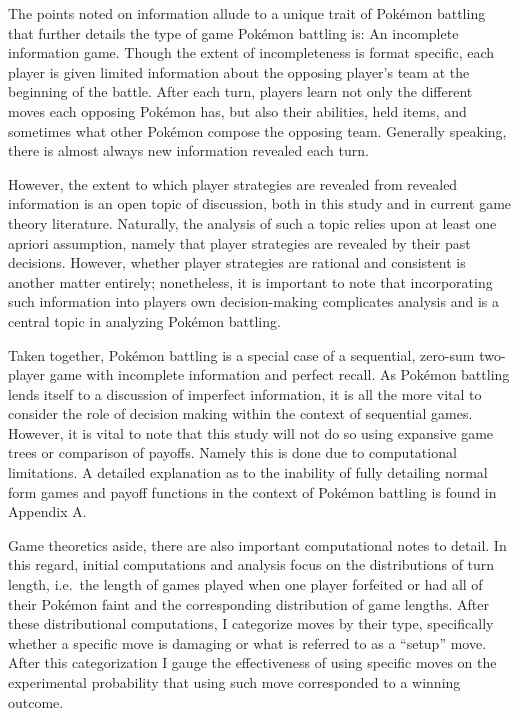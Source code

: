 \documentclass[12pt,twoside]{reedthesis}
\begin{document}
  The points noted on information allude to a unique trait of Pokémon
  battling that further details the type of game Pokémon battling is: An
  incomplete information game. Though the extent of incompleteness is
  format specific, each player is given limited information about the
  opposing player's team at the beginning of the battle. After each turn,
  players learn not only the different moves each opposing Pokémon has,
  but also their abilities, held items, and sometimes what other Pokémon
  compose the opposing team. Generally speaking, there is almost always
  new information revealed each turn.
  
  However, the extent to which player strategies are revealed from
  revealed information is an open topic of discussion, both in this study
  and in current game theory literature. Naturally, the analysis of such a
  topic relies upon at least one apriori assumption, namely that player
  strategies are revealed by their past decisions. However, whether player
  strategies are rational and consistent is another matter entirely;
  nonetheless, it is important to note that incorporating such information
  into players own decision-making complicates analysis and is a central
  topic in analyzing Pokémon battling.
  
  Taken together, Pokémon battling is a special case of a sequential,
  zero-sum two-player game with incomplete information and perfect recall.
  As Pokémon battling lends itself to a discussion of imperfect
  information, it is all the more vital to consider the role of decision
  making within the context of sequential games. However, it is vital to
  note that this study will not do so using expansive game trees or
  comparison of payoffs. Namely this is done due to computational
  limitations. A detailed explanation as to the inability of fully
  detailing normal form games and payoff functions in the context of
  Pokémon battling is found in Appendix A.
  
  Game theoretics aside, there are also important computational notes to
  detail. In this regard, initial computations and analysis focus on the
  distributions of turn length, i.e.~the length of games played when one
  player forfeited or had all of their Pokémon faint and the corresponding
  distribution of game lengths. After these distributional computations, I
  categorize moves by their type, specifically whether a specific move is
  damaging or what is referred to as a ``setup'' move. After this
  categorization I gauge the effectiveness of using specific moves on the
  experimental probability that using such move corresponded to a winning
  outcome.
  
\end{document}
